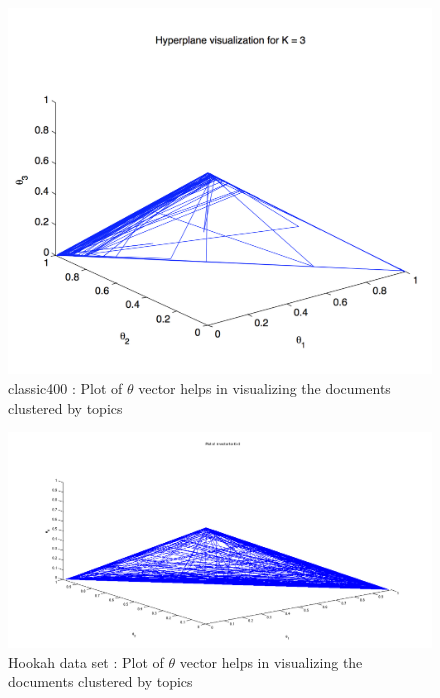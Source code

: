\documentclass[11pt,a4paper,oneside]{article}
\begin{document}
\begin{figure}[H]
\centering
\includegraphics[width=\columnwidth]{triangle_classic400}
\caption{classic400 : Plot of $\theta$ vector helps in visualizing the documents clustered by topics}
\label{fig:triangle_classic400}
\end{figure}

\begin{figure}[H]
\centering
\includegraphics[width=\columnwidth]{triangle_hookah}
\caption{Hookah data set : Plot of $\theta$ vector helps in visualizing the documents clustered by topics}
\label{fig:triangle_hookah}
\end{figure}
\end{document}
